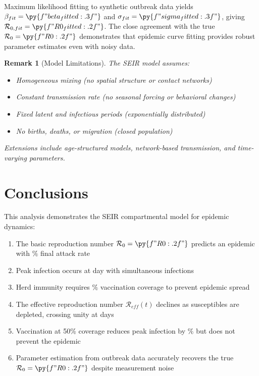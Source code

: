 \documentclass[a4paper, 11pt]{article}
\newtheorem{remark}{Remark}[section]
\begin{document}
Maximum likelihood fitting to synthetic outbreak data yields $\beta_{fit} = \py{f"{beta_fitted:.3f}"}$
and $\sigma_{fit} = \py{f"{sigma_fitted:.3f}"}$, giving $\mathcal{R}_{0,fit} = \py{f"{R0_fitted:.2f}"}$.
The close agreement with the true $\mathcal{R}_0 = \py{f"{R0:.2f}"}$ demonstrates that epidemic
curve fitting provides robust parameter estimates even with noisy data.

\begin{remark}[Model Limitations]
The SEIR model assumes:
\begin{itemize}
\item Homogeneous mixing (no spatial structure or contact networks)
\item Constant transmission rate (no seasonal forcing or behavioral changes)
\item Fixed latent and infectious periods (exponentially distributed)
\item No births, deaths, or migration (closed population)
\end{itemize}
Extensions include age-structured models, network-based transmission, and time-varying parameters.
\end{remark}

\section{Conclusions}

This analysis demonstrates the SEIR compartmental model for epidemic dynamics:

\begin{enumerate}
\item The basic reproduction number $\mathcal{R}_0 = \py{f"{R0:.2f}"}$ predicts an epidemic
with $\%$ final attack rate
\item Peak infection occurs at day  with 
simultaneous infections
\item Herd immunity requires $\%$ vaccination coverage
to prevent epidemic spread
\item The effective reproduction number $\mathcal{R}_{eff}(t)$ declines as susceptibles are
depleted, crossing unity at  days
\item Vaccination at 50\% coverage reduces peak infection by $\%$
but does not prevent the epidemic
\item Parameter estimation from outbreak data accurately recovers the true
$\mathcal{R}_0 = \py{f"{R0:.2f}"}$ despite measurement noise
\end{enumerate}
\end{document}
